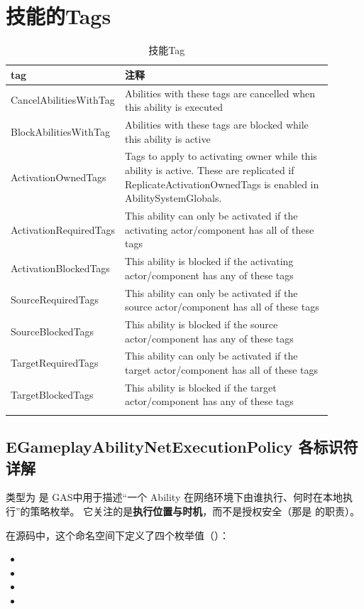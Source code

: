 \documentclass[10pt,CJKmath]{ctexart}
\begin{document}
\section{技能的Tags}
\begin{center}
	\begin{longtable}{p{0.2\linewidth}|p{0.7\linewidth}}
		\toprule
		\textbf{tag}&\textbf{注释}\\\midrule
		CancelAbilitiesWithTag & Abilities with these tags are cancelled when this ability is executed \\\midrule
		BlockAbilitiesWithTag& Abilities with these tags are blocked while this ability is active \\\midrule
		ActivationOwnedTags& Tags to apply to activating owner while this ability is active. These are replicated if ReplicateActivationOwnedTags is enabled in AbilitySystemGlobals. \\\midrule
		ActivationRequiredTags& This ability can only be activated if the activating actor/component has all of these tags \\\midrule
		ActivationBlockedTags& This ability is blocked if the activating actor/component has any of these tags \\\midrule
		SourceRequiredTags& This ability can only be activated if the source actor/component has all of these tags\\\midrule
		SourceBlockedTags&  This ability is blocked if the source actor/component has any of these tags \\\midrule
		TargetRequiredTags & This ability can only be activated if the target actor/component has all of these tags \\\midrule
		TargetBlockedTags & This ability is blocked if the target actor/component has any of these tags\\
		\caption{技能Tag}
	\end{longtable}
\end{center}
\subsection{EGameplayAbilityNetExecutionPolicy 各标识符详解}

类型为 是 GAS中用于描述“一个 Ability 在网络环境下由谁执行、何时在本地执行”的策略枚举。  
它关注的是\textbf{执行位置与时机}，而不是授权安全（那是  的职责）。

在源码中，这个命名空间下定义了四个枚举值（）：
\begin{itemize}
	\item {}
	\item {}
	\item {}
	\item {}
\end{itemize}
\end{document}
